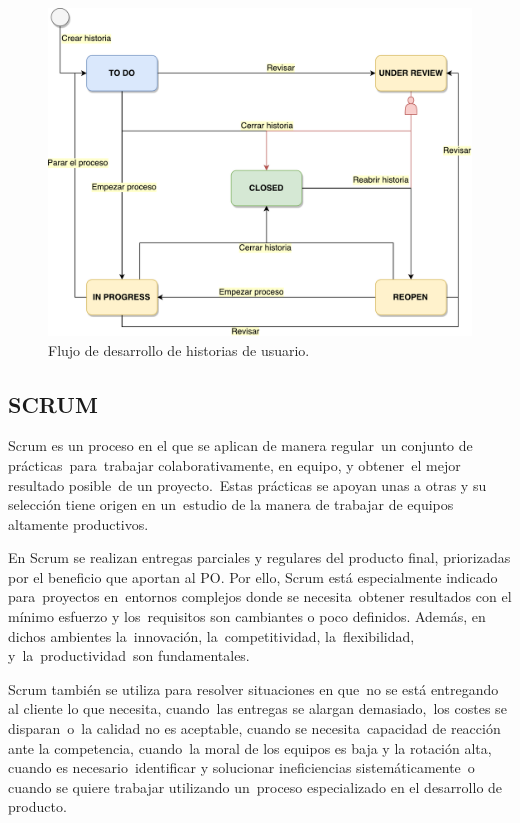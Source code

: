 \begin{figure}[H]
\centering
\includegraphics[width=125mm,scale=1]{Figuras/workflow}
\caption{Flujo de desarrollo de historias de usuario.}
  \label{workflow}
\end{figure}

\subsection{SCRUM}
Scrum es un proceso en el que se aplican de manera regular un conjunto de prácticas para trabajar colaborativamente, en equipo, y obtener el mejor resultado posible de un proyecto. Estas prácticas se apoyan unas a otras y su selección tiene origen en un estudio de la manera de trabajar de equipos altamente productivos.

En Scrum se realizan entregas parciales y regulares del producto final, priorizadas por el beneficio que aportan al PO. Por ello, Scrum está especialmente indicado para proyectos en entornos complejos donde se necesita obtener resultados con el mínimo esfuerzo y los requisitos son cambiantes o poco definidos. Además, en dichos ambientes la innovación, la competitividad, la flexibilidad, y la productividad son fundamentales.

Scrum también se utiliza para resolver situaciones en que no se está entregando al cliente lo que necesita, cuando las entregas se alargan demasiado, los costes se disparan o la calidad no es aceptable, cuando se necesita capacidad de reacción ante la competencia, cuando la moral de los equipos es baja y la rotación alta, cuando es necesario identificar y solucionar ineficiencias sistemáticamente o cuando se quiere trabajar utilizando un proceso especializado en el desarrollo de producto. 

